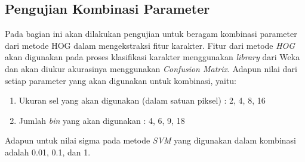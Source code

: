 \subsection{Pengujian Kombinasi Parameter}
\noindent Pada bagian ini akan dilakukan pengujian untuk beragam kombinasi parameter dari metode HOG dalam mengekstraksi fitur karakter. Fitur dari metode \textit{HOG} akan digunakan pada proses klasifikasi karakter menggunakan \textit{library} dari Weka dan akan diukur akurasinya menggunakan \textit{Confusion Matrix}. Adapun nilai dari setiap parameter yang akan digunakan untuk kombinasi, yaitu:
\begin{enumerate}
\item Ukuran sel yang akan digunakan (dalam satuan piksel) : 2, 4, 8, 16
\item Jumlah \textit{bin} yang akan digunakan : 4, 6, 9, 18
\end{enumerate}
\noindent Adapun untuk nilai sigma pada metode \textit{SVM} yang digunakan dalam kombinasi adalah 0.01, 0.1, dan 1.\\
